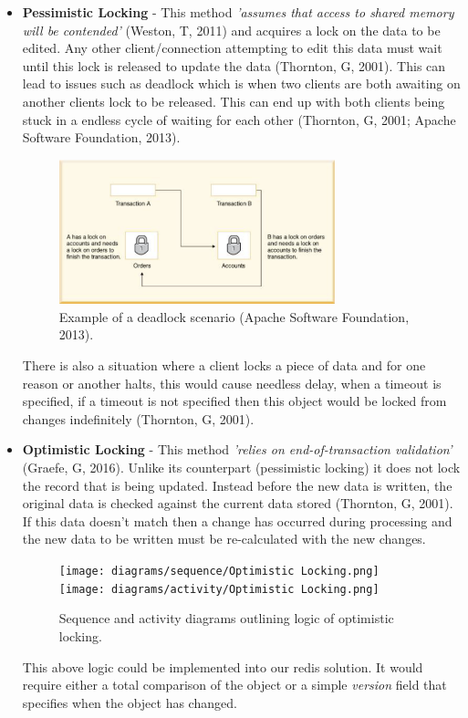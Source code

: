   \begin{itemize}
    \item \textbf{Pessimistic Locking} - This method \textit{'assumes that access to shared memory will be contended'} (Weston, T, 2011) and
    acquires a lock on the data to be edited. Any other client/connection attempting to edit this data must wait until this lock is released to update
    the data (Thornton, G, 2001). This can lead to issues such as deadlock which is when two clients are both awaiting on another clients lock to 
    be released. This can end up with both clients being stuck in a endless cycle of waiting for each other (Thornton, G, 2001; Apache Software Foundation, 2013).

    \begin{figure}[H]
      \centering
      \includegraphics[width=8cm]{assets/deadlock.png}
      \caption{Example of a deadlock scenario (Apache Software Foundation, 2013).}
      \label{fig:deadlock}
    \end{figure}

    There is also a situation where a client locks a piece of data and for one reason or another halts, this would cause needless delay, when a timeout is 
    specified, if a timeout is not specified then this object would be locked from changes indefinitely (Thornton, G, 2001).

    \item \textbf{Optimistic Locking} - This method \textit{'relies on end-of-transaction validation'} (Graefe, G, 2016). Unlike its counterpart
    (pessimistic locking) it does not lock the record that is being updated. Instead before the new data is written, the original data is checked against 
    the current data stored (Thornton, G, 2001). If this data doesn't match then a change has occurred during processing and the new data to be written 
    must be re-calculated with the new changes.

    \begin{figure}[H]
      \centering
      \texttt{[image: diagrams/sequence/Optimistic Locking.png]}
      \texttt{[image: diagrams/activity/Optimistic Locking.png]}
      \caption{Sequence and activity diagrams outlining logic of optimistic locking.}
      \label{fig:optimisticLocking}
    \end{figure}

    This above logic could be implemented into our redis solution. It would require either a total comparison of the object or a simple \textit{version}
    field that specifies when the object has changed.
  \end{itemize}

